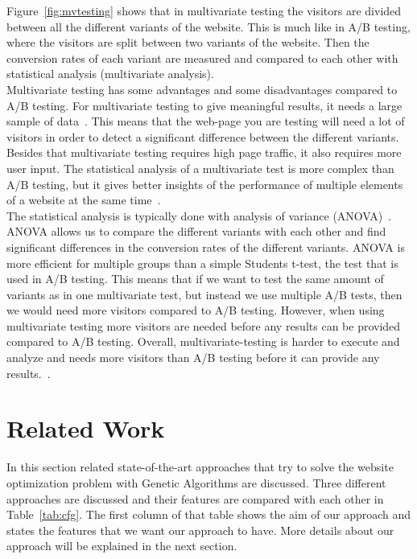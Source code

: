 \documentclass{report}
\begin{document}
Figure~\ref{fig:mvtesting} shows that in multivariate testing the visitors are divided between all the different variants of the website. This is much like in A/B testing, where the visitors are split between two variants of the website. Then the conversion rates of each variant are measured and compared to each other with statistical analysis (multivariate analysis).\\

Multivariate testing has some advantages and some disadvantages compared to A/B testing. For multivariate testing to give meaningful results, it needs a large sample of data~\cite{mvt}. This means that the web-page you are testing will need a lot of visitors in order to detect a significant difference between the different variants. Besides that multivariate testing requires high page traffic, it also requires more user input. The statistical analysis of a multivariate test is more complex than A/B testing, but it gives better insights of the performance of multiple elements of a website at the same time~\cite{kohavi2009controlled}. \\

The statistical analysis is typically done with analysis of variance (ANOVA)~\cite{iitsuka2015website}. ANOVA allows us to compare the different variants with each other and find significant differences in the conversion rates of the different variants. ANOVA is more efficient for multiple groups than a simple Students t-test, the test that is used in A/B testing. This means that if we want to test the same amount of variants as in one multivariate test, but instead we use multiple A/B tests, then we would need more visitors compared to A/B testing. However, when using multivariate testing more visitors are needed before any results can be provided compared to A/B testing. Overall, multivariate-testing is harder to execute and analyze and needs more visitors than A/B testing before it can provide any results.~\cite{diff, iitsuka2015website}.
\FloatBarrier

\chapter{Related Work}
In this section related state-of-the-art approaches that try to solve the website optimization problem with Genetic Algorithms are discussed. Three different approaches are discussed and their features are compared with each other in Table~\ref{tab:cfg}. The first column of that table shows the aim of our approach and states the features that we want our approach to have. More details about our approach will be explained in the next section.
\end{document}
